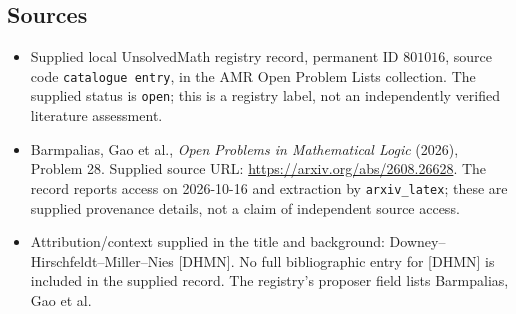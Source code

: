 \documentclass[11pt]{article}
\begin{document}
\subsection{Sources}
\begin{itemize}
\item Supplied local UnsolvedMath registry record, permanent ID \(801016\), source code \texttt{catalogue entry}, in the AMR Open Problem Lists collection. The supplied status is \texttt{open}; this is a registry label, not an independently verified literature assessment.
\item Barmpalias, Gao et al., \emph{Open Problems in Mathematical Logic} (2026), Problem 28. Supplied source URL: \url{https://arxiv.org/abs/2608.26628}. The record reports access on 2026-10-16 and extraction by \texttt{arxiv\_latex}; these are supplied provenance details, not a claim of independent source access.
\item Attribution/context supplied in the title and background: Downey--Hirschfeldt--Miller--Nies [DHMN]. No full bibliographic entry for [DHMN] is included in the supplied record. The registry's proposer field lists Barmpalias, Gao et al.
\end{itemize}
\end{document}
